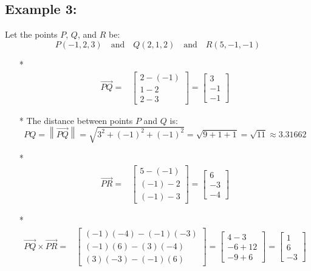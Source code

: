 \documentclass{article}
\begin{document}
\subsection*{Example 3:}

Let the points \(P\), \(Q\), and \(R\) be:
\[P(-1, 2, 3) \quad\text{and}\quad Q(2, 1, 2) \quad\text{and}\quad R(5, -1, -1)\] 
\begin{itemize}
\item[*] \begin{align*}
\overrightarrow{PQ} = & \begin{bmatrix} 2 - (-1) \\ 1 - 2 \\ 2 - 3 \end{bmatrix} = \begin{bmatrix} 3 \\ -1 \\ -1 \end{bmatrix}
\end{align*}
\item[*] The distance between points \(P\) and \(Q\) is: 
\[PQ = \left\|\overrightarrow{PQ}\right\| = \sqrt{3^2 + (-1)^2 + (-1)^2} = \sqrt{9 + 1 + 1} = \sqrt{11} \approx 3.31662\]
\item[*] \begin{align*}
\overrightarrow{PR} = & \begin{bmatrix} 5 - (-1) \\ (-1) - 2 \\ (-1) - 3 \end{bmatrix} = \begin{bmatrix} 6 \\ -3 \\ -4 \end{bmatrix}
\end{align*}
\item[*] \begin{align*}
\overrightarrow{PQ} \times \overrightarrow{PR} = & \begin{bmatrix} (-1)(-4) - (-1)(-3) \\ (-1)(6) - (3)(-4) \\ (3)(-3) - (-1)(6) \end{bmatrix} = \begin{bmatrix} 4 - 3 \\ -6 + 12 \\ -9 + 6 \end{bmatrix} = \begin{bmatrix} 1 \\ 6 \\ -3 \end{bmatrix}

\end{align*}
\end{itemize}
\end{document}
